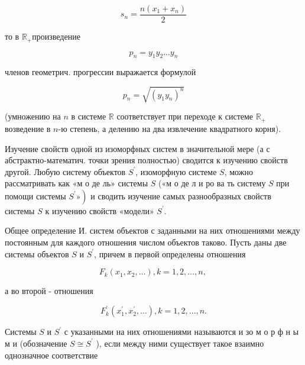 \documentclass[10pt]{article}
\begin{document}
\[

s_{n}=\frac{n\left(x_{1}+x_{n}\right)}{2}

\]



то в $\mathbb{R}_{+}$произведение



\[

p_{n}=y_{1} y_{2} \ldots y_{n}

\]



членов геометрич. прогрессии выражается формулой



\[

p_{n}=\sqrt{\left(y_{1} y_{n}\right)^{n}}

\]



(умножению на $n$ в системе $\mathbb{R}$ соответствует при переходе к системе $\mathbb{R}_{+}$возведение в $n$-ю степень, а делению на два извлечение квадратного корня).



Изучение свойств одной из изоморфных систем в значительной мере (а с абстрактно-математич. точки зрения полностью) сводится к изучению свойств другой. Любую систему объектов $S^{\prime}$, изоморфную системе $S$, можно рассматривать как «м о де ль» системы $S$ («м о де л и ро ва ть систему $S$ при помощи системы $\left.S^{\prime} »\right)$ и сводить изучение самых разнообразных свойств системы $S$ к изучению свойств «модели» $S^{\prime}$.



Общее определение И. систем объектов с заданными на них отношениями между постоянным для каждого отношения числом объектов таково. Пусть даны две системы объектов $S$ и $S^{\prime}$, причем в первой определены отношения



\[

F_{k}\left(x_{1}, x_{2}, \ldots\right), k=1,2, \ldots, n \text {, }

\]



а во второй - отношения



\[

F_{k}^{\prime}\left(x_{1}^{\prime}, x_{2}^{\prime}, \ldots\right), k=1,2, \ldots, n .

\]



Системы $S$ и $S^{\prime}$ с указанными на них отношениями называются и зо м о р ф н ы м и (обозначение $S \cong S^{\prime}$ ), если между ними существует такое взаимно однозначное соответствие
\end{document}
